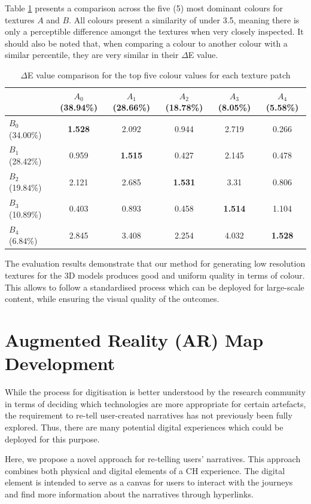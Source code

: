 \documentclass[acmlarge,screen,dvipsnames]{acmart}
\begin{document}
Table \ref{tab:delta} presents a comparison across the five (5) most dominant colours for textures $ A $ and $ B $. 
All colours present a similarity of under 3.5, meaning there is only a perceptible difference amongst the textures when very closely inspected. It should also be noted that, when comparing a colour to another colour with a similar percentile, they are very similar in their $\Delta$E value. 

\begin{table}[h]
\begin{tabular}{ | l | c | c | c | c | c |}
\toprule
  & $ A_0 $ (38.94\%)  & $ A_1 $ (28.66\%) & $ A_2 $ (18.78\%)& $ A_3 $ (8.05\%) & $ A_4 $ (5.58\%)  \\ 
\midrule
 $ B_0 $ (34.00\%) & \textbf{1.528} & 2.092 & 0.944 & 2.719 & 0.266  \\ 
 $ B_1 $ (28.42\%)& 0.959 & \textbf{1.515} & 0.427 & 2.145 & 0.478  \\ 
 $ B_2 $ (19.84\%)& 2.121 & 2.685 & \textbf{1.531} & 3.31 &  0.806 \\ 
 $ B_3 $ (10.89\%) & 0.403 & 0.893 & 0.458 & \textbf{1.514} & 1.104  \\ 
 $ B_4 $ (6.84\%) & 2.845 & 3.408 & 2.254 & 4.032 & \textbf{1.528}  \\ 
\bottomrule
\end{tabular}
\caption{$\Delta$E value comparison for the top five colour values for each texture patch}
\label{tab:delta} 
\end{table}

The evaluation results demonstrate that our method for generating 
low resolution textures for the 3D models produces good and uniform quality 
in terms of colour. This allows to
follow a standardised process which can be deployed for large-scale
content, while ensuring the visual quality of the outcomes.


\section{Augmented Reality (AR) Map Development} \label{tech} 

While the process for digitisation is better understood by the research
community in terms of deciding which technologies are more appropriate for certain artefacts, the requirement to re-tell user-created narratives has not previously been fully
explored. Thus, there are many potential digital experiences which could be
deployed for this purpose. 

Here, we propose a novel approach for re-telling users' narratives. This approach
combines both physical and digital elements of a CH experience. The digital element
is intended to serve as a canvas for users to interact with the journeys and
find more information about the narratives through hyperlinks. 
\end{document}
